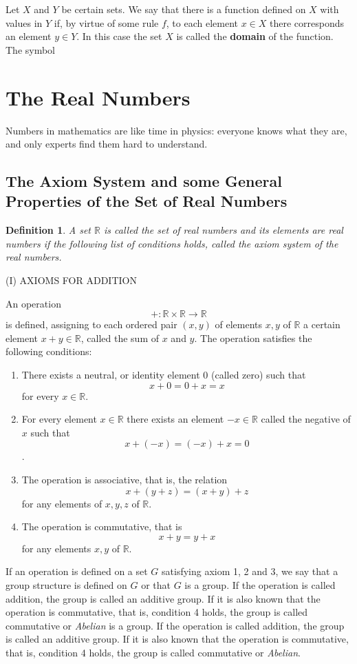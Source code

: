 \documentclass[a4paper,12pt]{article} %
\newtheorem{definition}{Definition}[section]
\begin{document}
Let $X$ and $Y$ be certain sets. We say that there is a function defined 
on $X$ with values in $Y$ if, by virtue of some rule $f$, to each element 
$x \in X$ there corresponds an element $y \in Y$. In this case the set $X$
is called the {\color{red} \textbf{domain}} of the function.
The symbol 


\section{The Real Numbers}
Numbers in mathematics are like time in physics: everyone knows what 
they are, and only experts find them hard to understand.
\subsection{The Axiom System and some General Properties of the 
Set of Real Numbers}
\begin{definition} {A set $\mathbb{R}$ is called the set of \textit{real numbers}
and its elements are \textit{real numbers} if the following list of conditions
holds, called the axiom system of the real numbers.}
\end{definition}

\begin{center}
    (I) AXIOMS FOR ADDITION
\end{center}
An operation 
\[+:\mathbb{R}\times\mathbb{R} \to \mathbb{R}\]
is defined, assigning to each ordered pair $(x,y)$ of elements 
$x,y$ of $\mathbb{R}$ a certain element $x+y\in\mathbb{R}$, called 
the sum of $x$ and $y$. The operation satisfies the following 
conditions:
\begin{enumerate}
    \item There exists a neutral, or identity element 0 
        (called zero) such that 
    \[x+0=0+x=x\]
    for every $x\in\mathbb{R}$.
    \item For every element $x\in \mathbb{R}$ there exists an element 
    $-x\in\mathbb{R}$ called the negative of $x$ such that
        \[x+(-x)=(-x)+x=0\].
    \item The operation is associative, that is, the relation
        \[x+(y+z) = (x+y)+z\] for any elements of $x,y,z$ of $\mathbb{R}$.
    \item The operation is commutative, that is 
        \[x+y=y+x\] for any elements $x,y$ of $\mathbb{R}$.
\end{enumerate}

If an operation is defined on a set $G$ satisfying axiom 1, 2 and 3, we
say that a group structure is defined on $G$ or that $G$ is a group. 
If the operation is called addition, the group is called an additive 
group. If it is also known that the operation is commutative, that is, 
condition 4 holds, the group is called commutative or \textit{Abelian} is a group. 
If the operation is called addition, the group is called an additive 
group. If it is also known that the operation is commutative, that is, 
condition 4 holds, the group is called commutative or \textit{Abelian}.
\end{document}
